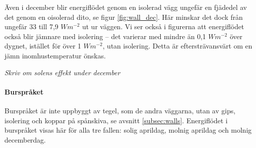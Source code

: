 Även i december blir energiflödet genom en isolerad vägg ungefär en fjädedel av det 
genom en oisolerad dito, se figur \ref{fig:wall_dec}. Här minskar det dock från ungefär 33 
till 7,9 $\unit{W m^{-2}}$ ut ur väggen. Vi ser också i figurerna att energiflödet också blir 
jämnare med isolering – det varierar med mindre än 0,1 $\unit{W m^{-2}}$ över dygnet, 
istället för över 1 $\unit{W m^{-2}}$, utan isolering. Detta är eftersträvansvärt om en jämn inomhustemperatur önskas.

\emph{\color{red} Skriv om solens effekt under december}


\paragraph{Burspråket}

Burspråket är inte uppbyggt av tegel, som de andra väggarna, utan av gips, isolering och koppar på spånskiva, se avsnitt \ref{subsec:walls}. Energiflödet i burspråket visas här för alla tre fallen: solig aprildag, molnig aprildag och molnig decemberdag.


